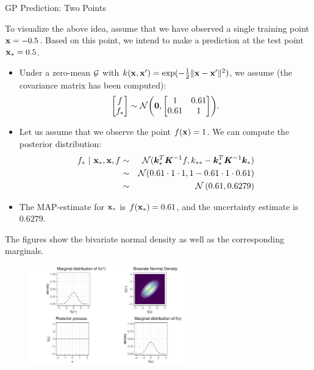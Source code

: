 \begin{frame}[c,allowframebreaks]{GP Prediction: Two Points}

To visualize the above idea, assume that we have observed a single training point $\mathbf{x} = - 0.5$. Based on this point, we intend to make a prediction at the test point $\mathbf{x}_* = 0.5$.

\vspace{3mm}

\begin{itemize}
  \item Under a zero-mean $\mathcal{G}$ with $k(\mathbf{x}, \mathbf{x}^\prime) = \exp(-\frac{1}{2}\|\mathbf{x} - \mathbf{x}^\prime\|^2)$, we assume (the covariance matrix has been computed):
  \vspace{-3mm}
  $$\begin{bmatrix} f \\ f_* \end{bmatrix} \sim \mathcal{N}\biggl(\bm{0}, \begin{bmatrix} 1 & 0.61 \\ 0.61 & 1\end{bmatrix}\biggr).$$ 
  \item Let us assume that we observe the point $f(\mathbf{x}) = 1$. We can compute the posterior distribution:
\vspace{-5mm}
  \begin{eqnarray*}
    f_* ~|~ \mathbf{x}_*, \mathbf{x}, f &\sim& \mathcal{N}(\bm{k}_{*}^{T}\bm{K}^{-1}f, k_{**} - \bm{k}_*^T \bm{K}^{-1}\bm{k}_*) \\
    &\sim& \mathcal{N}(0.61 \cdot 1 \cdot 1, 1 - 0.61 \cdot 1 \cdot 0.61) \\
    &\sim& \mathcal{N}\left(0.61, 0.6279\right) 
  \end{eqnarray*}
  \item The MAP-estimate for $\mathbf{x}_*$ is $f(\mathbf{x}_*) = 0.61$, and the uncertainty estimate is $0.6279$.

\end{itemize}

\framebreak


The figures show the bivariate normal density as well as the corresponding marginals. 


\begin{figure}
\includegraphics[width=0.6\textwidth]{figure/gp-posterior-1-1.pdf}\par
\end{figure}


\end{frame}

